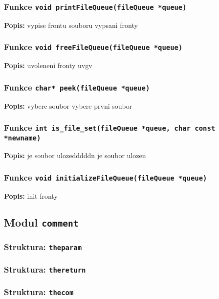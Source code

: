 \documentclass[12pt, a4paper]{article}
\begin{document}
\subsubsection{Funkce \texttt{void printFileQueue(fileQueue *queue)}}
\textbf{Popis: }vypise frontu souboru vypsani fronty\\
\par\noindent
\subsubsection{Funkce \texttt{void freeFileQueue(fileQueue *queue)}}
\textbf{Popis: }uvoleneni fronty uvgv\\
\par\noindent
\subsubsection{Funkce \texttt{char* peek(fileQueue *queue)}}
\textbf{Popis: }vybere soubor vybere prvni soubor\\
\par\noindent
\subsubsection{Funkce \texttt{int is\_file\_set(fileQueue *queue, char const *newname)}}
\textbf{Popis: }je soubor ulozedddddn je soubor ulozen\\
\par\noindent
\subsubsection{Funkce \texttt{void initializeFileQueue(fileQueue *queue)}}
\textbf{Popis: }init fronty\\
\par\noindent
\subsection{Modul \texttt{comment}}
\subsubsection{Struktura: \texttt{theparam }}
\subsubsection{Struktura: \texttt{thereturn }}
\subsubsection{Struktura: \texttt{thecom }}
\end{document}
